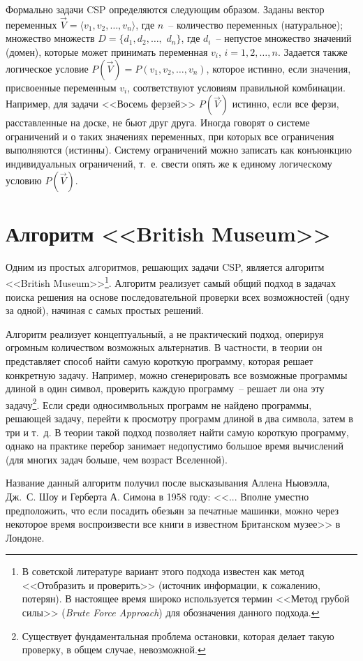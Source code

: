 \documentclass[a4paper,14pt, openany, twoside, draft]{extbook} %
\newcommand{\eeng}[1]{\emph{\foreignlanguage{english}{#1}}}
\begin{document}
Формально задачи CSP определяются следующим образом. Заданы вектор переменных $\vec{V}=\langle v_1, v_2, \ldots, v_n\rangle$, где $n$~-- количество переменных (натуральное); множество множеств $D=\{ d_1, d_2, \ldots,$ $d_n\}$, где $d_i$~-- непустое множество значений (домен), которые может принимать переменная $v_i$, $i=1,2,\ldots,n$. Задается также логическое условие $P(\vec{V})=P(v_1,v_2,\ldots,v_n)$, которое истинно, если значения, присвоенные переменным $v_i$, соответствуют условиям правильной комбинации. Например, для задачи <<Восемь ферзей>> $P(\vec{V})$ истинно, если все ферзи, расставленные на доске, не бьют друг друга. Иногда говорят о системе ограничений и о таких значениях переменных, при которых все ограничения выполняются (истинны). Систему ограничений можно записать как конъюнкцию индивидуальных ограничений, т.~е. свести опять же к единому логическому условию $P(\vec{V})$.

\section{Алгоритм <<British Museum>>}

Одним из простых алгоритмов, решающих задачи CSP, является алгоритм <<British Museum>>\footnote{В советской литературе вариант этого подхода известен как метод <<Отобразить и проверить>> (источник информации, к сожалению, потерян). В настоящее время широко используется термин <<Метод грубой силы>> (\eeng{Brute Force Approach}) для обозначения данного подхода.}. Алгоритм реализует самый общий подход в задачах поиска решения на основе последовательной проверки всех возможностей (одну за одной), начиная с самых простых решений.

Алгоритм реализует концептуальный, а не практический подход, оперируя огромным количеством возможных альтернатив. В частности, в теории он представляет способ найти самую короткую программу, которая решает конкретную задачу. Например, можно сгенерировать все возможные программы длиной в один символ, проверить каждую программу~-- решает ли она эту задачу\footnote{Существует фундаментальная проблема остановки, которая делает такую проверку, в общем случае, невозможной.}. Если среди односимвольных программ не найдено программы, решающей задачу, перейти к просмотру программ длиной в два символа, затем в три и т.~д. В теории такой подход позволяет найти самую короткую программу, однако на практике перебор занимает недопустимо большое время вычислений (для многих задач больше, чем возраст Вселенной).

Название данный алгоритм получил после высказывания Аллена Ньювэлла, Дж.~С. Шоу и Герберта А. Симона в 1958 году: <<... Вполне уместно предположить, что если посадить обезьян за печатные машинки, можно через некоторое время воспроизвести все книги в известном Британском музее>> в Лондоне.
\end{document}
